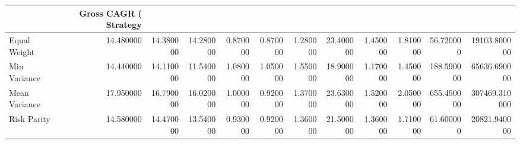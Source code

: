 \begin{tabular}{lrrrrrrrrrrr}
\toprule
 & Gross CAGR (%
Strategy &  &  &  &  &  &  &  &  &  &  &  \\
\midrule
Equal Weight & 14.480000 & 14.380000 & 14.280000 & 0.870000 & 0.870000 & 1.280000 & 23.400000 & 1.450000 & 1.810000 & 56.720000 & 19103.800000 \\
Min Variance & 14.440000 & 14.110000 & 11.540000 & 1.080000 & 1.050000 & 1.550000 & 18.900000 & 1.170000 & 1.450000 & 188.590000 & 65636.690000 \\
Mean Variance & 17.950000 & 16.790000 & 16.020000 & 1.000000 & 0.920000 & 1.370000 & 23.630000 & 1.520000 & 2.050000 & 655.490000 & 307469.310000 \\
Risk Parity & 14.580000 & 14.470000 & 13.540000 & 0.930000 & 0.920000 & 1.360000 & 21.500000 & 1.360000 & 1.710000 & 61.600000 & 20821.940000 \\
\bottomrule
\end{tabular}
